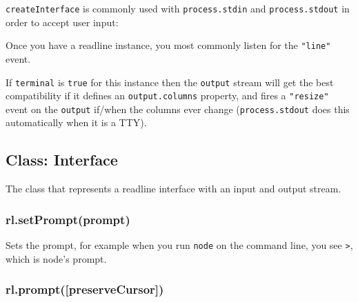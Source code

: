 \begin{Shaded}
\begin{Highlighting}[]
 
  \NormalTok{callback(null, [[}\NormalTok{], linePartial]);}
\NormalTok{\}}
\end{Highlighting}
\end{Shaded}

\texttt{createInterface} is commonly used with \texttt{process.stdin}
and \texttt{process.stdout} in order to accept user input:

\begin{Shaded}
\begin{Highlighting}[]
 \NormalTok{);}
 \NormalTok{(\{}
  \NormalTok{: }\NormalTok{,}
  \NormalTok{: }
\NormalTok{\});}
\end{Highlighting}
\end{Shaded}

Once you have a readline instance, you most commonly listen for the
\texttt{"line"} event.

If \texttt{terminal} is \texttt{true} for this instance then the
\texttt{output} stream will get the best compatibility if it defines an
\texttt{output.columns} property, and fires a \texttt{"resize"} event on
the \texttt{output} if/when the columns ever change
(\texttt{process.stdout} does this automatically when it is a TTY).

\subsection{Class: Interface}

The class that represents a readline interface with an input and output
stream.

\subsubsection{rl.setPrompt(prompt)}

Sets the prompt, for example when you run \texttt{node} on the command
line, you see \texttt{\textgreater{}}, which is node's prompt.

\subsubsection{rl.prompt({[}preserveCursor{]})}

